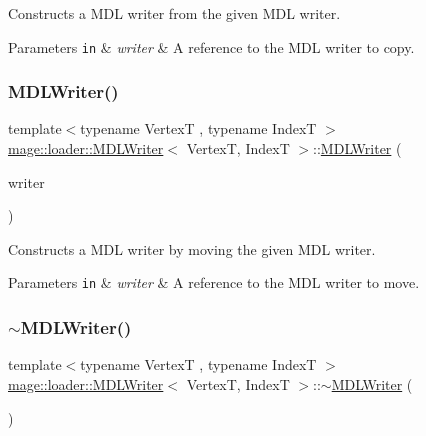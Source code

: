 Constructs a M\+DL writer from the given M\+DL writer.


\begin{DoxyParams}[1]{Parameters}
\mbox{\tt in}  & {\em writer} & A reference to the M\+DL writer to copy. \\
\hline
\end{DoxyParams}
\hypertarget{classmage_1_1loader_1_1_m_d_l_writer_a0a75a99bc24a940df08a9b573bf4a61b}{}\label{classmage_1_1loader_1_1_m_d_l_writer_a0a75a99bc24a940df08a9b573bf4a61b} 
\subsubsection{\texorpdfstring{M\+D\+L\+Writer()}{MDLWriter()}\hspace{0.1cm}{\footnotesize\ttfamily [3/3]}}
{\footnotesize\ttfamily template$<$typename VertexT , typename IndexT $>$ \\
\hyperlink{classmage_1_1loader_1_1_m_d_l_writer}{mage\+::loader\+::\+M\+D\+L\+Writer}$<$ VertexT, IndexT $>$\+::\hyperlink{classmage_1_1loader_1_1_m_d_l_writer}{M\+D\+L\+Writer} (\begin{DoxyParamCaption}\item[{\hyperlink{classmage_1_1loader_1_1_m_d_l_writer}{M\+D\+L\+Writer}$<$ VertexT, IndexT $>$ \&\&}]{writer }\end{DoxyParamCaption})\hspace{0.3cm}{\ttfamily [noexcept]}}

Constructs a M\+DL writer by moving the given M\+DL writer.


\begin{DoxyParams}[1]{Parameters}
\mbox{\tt in}  & {\em writer} & A reference to the M\+DL writer to move. \\
\hline
\end{DoxyParams}
\hypertarget{classmage_1_1loader_1_1_m_d_l_writer_a4697f6802827fb51ac620084b45466da}{}\label{classmage_1_1loader_1_1_m_d_l_writer_a4697f6802827fb51ac620084b45466da} 
\subsubsection{\texorpdfstring{$\sim$\+M\+D\+L\+Writer()}{~MDLWriter()}}
{\footnotesize\ttfamily template$<$typename VertexT , typename IndexT $>$ \\
\hyperlink{classmage_1_1loader_1_1_m_d_l_writer}{mage\+::loader\+::\+M\+D\+L\+Writer}$<$ VertexT, IndexT $>$\+::$\sim$\hyperlink{classmage_1_1loader_1_1_m_d_l_writer}{M\+D\+L\+Writer} (\begin{DoxyParamCaption}{ }\end{DoxyParamCaption})}

